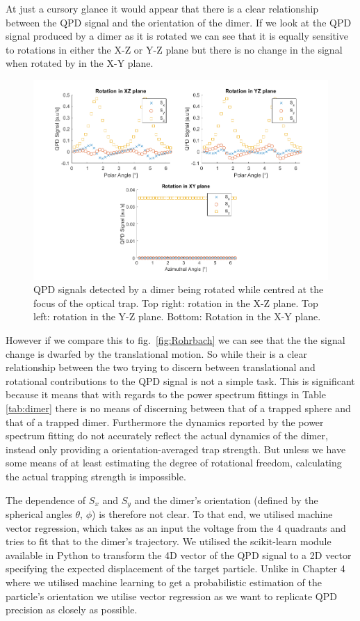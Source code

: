 At just a cursory glance it would appear that there is a clear
relationship between the QPD signal and the orientation of the 
dimer. If we look at the QPD signal produced by a dimer as it is 
rotated we can see that it is equally sensitive to rotations in
either the X-Z or Y-Z plane but there is no change in the signal 
when rotated by in the X-Y plane. 
\begin{figure}
	\centering
	\includegraphics[width=0.9\linewidth]{rotation_figure.png}
	\caption{QPD signals detected by a dimer being rotated while
		centred at the focus of the optical trap. Top right:
		rotation in the X-Z plane. Top left: rotation in the
		Y-Z plane. Bottom: Rotation in the X-Y plane.}
	\label{fig:QPD_rotation}
\end{figure}

However if we compare this to fig.~\ref{fig:Rohrbach} we can see 
that the the signal change is dwarfed by the translational motion. 
So while their is a clear relationship between the two trying to
discern between translational and rotational contributions to the
QPD signal is not a simple task. This is significant because it 
means that with regards to the power spectrum fittings in Table 
\ref{tab:dimer} there is no means of discerning between that of 
a trapped sphere and that of a trapped dimer. Furthermore the 
dynamics reported by the power spectrum fitting do not accurately 
reflect the actual dynamics of the dimer, instead only providing 
a orientation-averaged trap strength. But unless we have some means
of at least estimating the degree of rotational freedom, calculating
the actual trapping strength is impossible. 

The dependence of $S_x$ and $S_y$ and the dimer's orientation
(defined by the spherical angles $\theta$, $\phi$) is therefore
not clear. To that end, we utilised machine vector regression,
which takes as an input the voltage from the 4 quadrants and 
tries to fit that to the dimer's trajectory. We utilised the 
scikit-learn module available in Python to transform the 4D vector
of the QPD signal to a 2D vector specifying the expected displacement
of the target particle. Unlike in Chapter 4 where we utilised 
machine learning to get a probabilistic estimation of the 
particle's orientation we utilise vector regression as we 
want to replicate QPD precision as closely as possible. 

